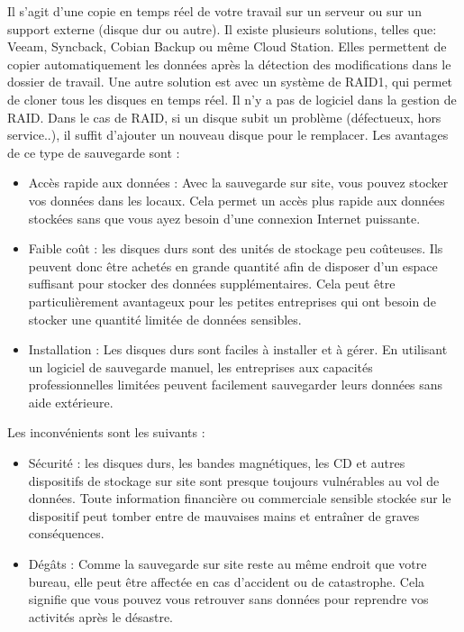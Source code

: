 \documentclass[pfe]{tnreport} %
\begin{document}
Il s'agit d'une copie en temps réel de votre travail sur un serveur ou sur un support externe (disque dur ou autre). Il existe plusieurs solutions, telles que: Veeam, Syncback, Cobian Backup ou même Cloud Station.\newline
Elles permettent de copier automatiquement les données après la détection des modifications dans le dossier de travail. Une autre solution est avec un système de RAID1, qui permet de cloner tous les disques en temps réel. Il n'y a pas de logiciel dans la gestion de RAID.\newline
Dans le cas de RAID, si un disque subit un problème (défectueux, hors service..), il suffit d'ajouter un nouveau disque pour le remplacer.
Les avantages de ce type de sauvegarde sont : \newline
\begin{itemize}
    \item Accès rapide aux données : Avec la sauvegarde sur site, vous pouvez stocker vos données dans les locaux. Cela permet un accès plus rapide aux données stockées sans que vous ayez besoin d'une connexion Internet puissante.

\item Faible coût : les disques durs sont des unités de stockage peu coûteuses. Ils peuvent donc être achetés en grande quantité afin de disposer d'un espace suffisant pour stocker des données supplémentaires. Cela peut être particulièrement avantageux pour les petites entreprises qui ont besoin de stocker une quantité limitée de données sensibles.

\item Installation : Les disques durs sont faciles à installer et à gérer. En utilisant un logiciel de sauvegarde manuel, les entreprises aux capacités professionnelles limitées peuvent facilement sauvegarder leurs données sans aide extérieure. \newline
\end{itemize} 

Les inconvénients sont les suivants :
\begin{itemize}
    \item Sécurité : les disques durs, les bandes magnétiques, les CD et autres dispositifs de stockage sur site sont presque toujours vulnérables au vol de données. Toute information financière ou commerciale sensible stockée sur le dispositif peut tomber entre de mauvaises mains et entraîner de graves conséquences.

\item  Dégâts : Comme la sauvegarde sur site reste au même endroit que votre bureau, elle peut être affectée en cas d'accident ou de catastrophe. Cela signifie que vous pouvez vous retrouver sans données pour reprendre vos activités après le désastre.

\end{itemize}
\end{document}
